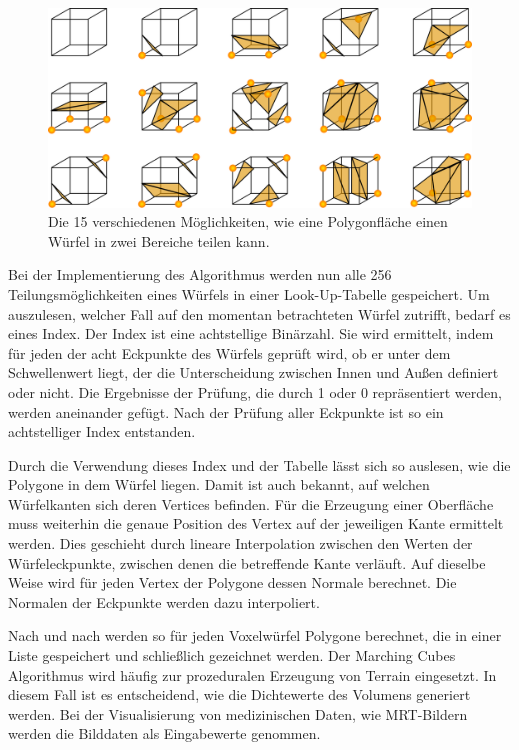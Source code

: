 \begin{figure}[!htb]
	\centering
	\includegraphics[width=0.7\linewidth]{images/MarchingCubes.png}
	\caption{Die 15 verschiedenen Möglichkeiten, wie eine Polygonfläche einen Würfel in zwei Bereiche teilen kann.}
	\label{img:marchingCubes}
\end{figure}
\FloatBarrier

Bei der Implementierung des Algorithmus werden nun alle 256 Teilungsmöglichkeiten eines Würfels in einer Look-Up-Tabelle gespeichert. Um auszulesen, welcher Fall auf den momentan betrachteten Würfel zutrifft, bedarf es eines Index. 
Der Index ist eine achtstellige Binärzahl. Sie wird ermittelt, indem für jeden der acht Eckpunkte des Würfels geprüft wird, ob er unter dem Schwellenwert liegt, der die Unterscheidung zwischen Innen und Außen definiert oder nicht. Die Ergebnisse der Prüfung, die durch 1 oder 0 repräsentiert werden, werden aneinander gefügt. Nach der Prüfung aller Eckpunkte ist so ein achtstelliger Index entstanden. 

Durch die Verwendung dieses Index und der Tabelle lässt sich so auslesen, wie die Polygone in dem Würfel liegen. Damit ist auch bekannt, auf welchen Würfelkanten sich deren Vertices befinden. Für die Erzeugung einer Oberfläche muss weiterhin die genaue Position des Vertex auf der jeweiligen Kante ermittelt werden. Dies geschieht durch lineare Interpolation zwischen den Werten der Würfeleckpunkte, zwischen denen die betreffende Kante verläuft. 
Auf dieselbe Weise wird für jeden Vertex der Polygone dessen Normale berechnet. Die Normalen der Eckpunkte werden dazu interpoliert.

Nach und nach werden so für jeden Voxelwürfel Polygone berechnet, die in einer Liste gespeichert und schließlich gezeichnet werden.
Der Marching Cubes Algorithmus wird häufig zur prozeduralen Erzeugung von Terrain eingesetzt. In diesem Fall ist es entscheidend, wie die Dichtewerte des Volumens generiert werden. Bei der Visualisierung von medizinischen Daten, wie MRT-Bildern werden die Bilddaten als Eingabewerte genommen.



